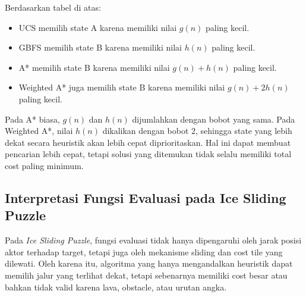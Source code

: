 Berdasarkan tabel di atas:
\begin{itemize}
	\item UCS memilih state A karena memiliki nilai $g(n)$ paling kecil.
	\item GBFS memilih state B karena memiliki nilai $h(n)$ paling kecil.
	\item A* memilih state B karena memiliki nilai $g(n)+h(n)$ paling kecil.
	\item Weighted A* juga memilih state B karena memiliki nilai $g(n)+2h(n)$ paling kecil.
\end{itemize}

\begin{tcolorbox}[
	colback=purple!5,
	colframe=purple!60!black,
	title=\textbf{Dampak Bobot pada Weighted A*},
	arc=2mm,
	boxrule=0.8pt
]
Pada A* biasa, $g(n)$ dan $h(n)$ dijumlahkan dengan bobot yang sama. 
Pada Weighted A*, nilai $h(n)$ dikalikan dengan bobot $2$, sehingga state yang lebih dekat secara heuristik akan lebih cepat diprioritaskan. 
Hal ini dapat membuat pencarian lebih cepat, tetapi solusi yang ditemukan tidak selalu memiliki total cost paling minimum.
\end{tcolorbox}

\subsection{Interpretasi Fungsi Evaluasi pada Ice Sliding Puzzle}

Pada \textit{Ice Sliding Puzzle}, fungsi evaluasi tidak hanya dipengaruhi oleh jarak posisi aktor terhadap target, tetapi juga oleh mekanisme sliding dan cost tile yang dilewati. 
Oleh karena itu, algoritma yang hanya mengandalkan heuristik dapat memilih jalur yang terlihat dekat, tetapi sebenarnya memiliki cost besar atau bahkan tidak valid karena lava, obstacle, atau urutan angka.

